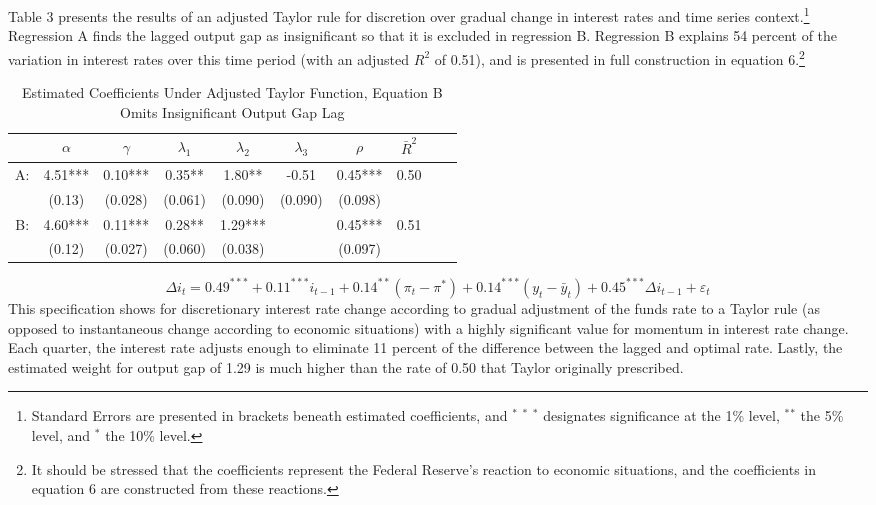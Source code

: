 \documentclass[notitlepage,12pt]{article}
\begin{document}
Table 3 presents the results of an adjusted Taylor rule for discretion over gradual change in interest rates and time series context.\footnote{Standard Errors are presented in brackets beneath estimated coefficients, and $^*$ $^*$ $^*$ designates significance at the 1\% level, $^*$$^*$ the 5\% level, and $^*$ the 10\% level.}  Regression A finds the lagged output gap as insignificant so that it is excluded in regression B.  Regression B explains 54 percent of the variation in interest rates over this time period (with an adjusted $R^2$ of 0.51), and is presented in full construction in equation 6.\footnote{It should be stressed that the coefficients represent the Federal Reserve's reaction to economic situations, and the coefficients in equation 6 are constructed from these reactions.}
\begin{table}[H]
\centering
\caption{Estimated Coefficients Under Adjusted Taylor Function, Equation B Omits Insignificant Output Gap Lag}
\begin{tabular}{ccccccc|ccc}
&$\alpha$ & $\gamma$ & $\lambda_1$ & $\lambda_2$& $\lambda_3$&$\rho $&${\bar R}^2$ \\
\toprule
A:&4.51***& 0.10*** & 0.35** & 1.80** &-0.51 & 0.45*** & 0.50 \\
&(0.13)&(0.028)&(0.061)&(0.090)&(0.090)&(0.098)&\\
\midrule
B:&4.60***&0.11***&0.28**&1.29***&&0.45***& 0.51 \\
& (0.12) &(0.027)&(0.060) &(0.038) &&(0.097) \\
\midrule
\bottomrule
\end{tabular}
\end{table}
\begin{equation}
\Delta i_t = 0.49^{***} +0.11^{***} i_{t-1} + 0.14^{**}(\pi_t-\pi^*) + 0.14^{***}(y_{t}-{\bar  y}_{t})+ 0.45^{***} \Delta i_{t-1} +\varepsilon_t 
\end{equation}
This specification shows for discretionary interest rate change according to gradual adjustment of the funds rate to a Taylor rule (as opposed to instantaneous change according to economic situations) with a highly significant value for momentum in interest rate change.  Each quarter, the interest rate adjusts enough to eliminate 11 percent of the difference between the lagged and optimal rate. Lastly, the estimated weight for output gap of 1.29 is much higher than the rate of 0.50 that Taylor originally prescribed.
\end{document}
